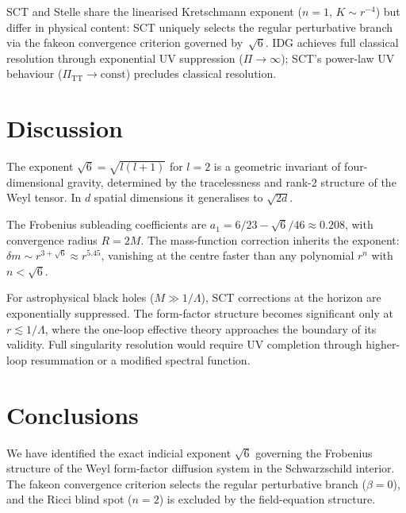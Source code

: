\documentclass[a4paper,12pt]{article}
\newcommand{\Lam}{\Lambda}
\newcommand{\PiTT}{\Pi_{\mathrm{TT}}}
\begin{document}
SCT and Stelle share the linearised Kretschmann exponent ($n=1$,
$K\sim r^{-4}$) but differ in physical content: SCT uniquely
selects the regular perturbative branch via the fakeon convergence
criterion governed by~$\sqrt{6}$.
IDG achieves full classical resolution through exponential UV
suppression ($\Pi\to\infty$); SCT's power-law UV behaviour
($\PiTT\to\mathrm{const}$) precludes classical resolution.

\section{Discussion}\label{sec:discussion}

The exponent $\sqrt{6}=\sqrt{l(l+1)}$ for $l=2$ is a geometric invariant
of four-dimensional gravity, determined by the tracelessness and rank-2
structure of the Weyl tensor.
In $d$ spatial dimensions it generalises to $\sqrt{2d}$.

The Frobenius subleading coefficients are
$a_1=6/23-\sqrt{6}/46\approx 0.208$, with convergence radius $R=2M$.
The mass-function correction inherits the exponent:
$\delta m\sim r^{3+\sqrt{6}}\approx r^{5.45}$, vanishing at the centre
faster than any polynomial $r^n$ with $n<\sqrt{6}$.

For astrophysical black holes ($M\gg 1/\Lam$), SCT corrections at the
horizon are exponentially suppressed.
The form-factor structure becomes significant only at $r\lesssim 1/\Lam$,
where the one-loop effective theory approaches the boundary of its validity.
Full singularity resolution would require UV completion through
higher-loop resummation or a modified spectral function.

\section{Conclusions}\label{sec:conclusions}

We have identified the exact indicial exponent $\sqrt{6}$ governing the
Frobenius structure of the Weyl form-factor diffusion system in the
Schwarzschild interior.
The fakeon convergence criterion selects the regular perturbative
branch ($\beta=0$), and the Ricci blind spot ($n=2$) is excluded by
the field-equation structure.
\end{document}
